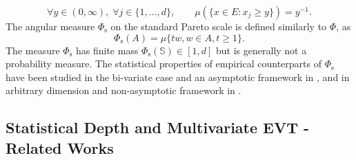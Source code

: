 \documentclass{article}
\numberwithin{equation}{section}
\newcommand{\norm}[1]{\left\Vert{#1}\right\Vert}
\newcommand{\point}{\,\cdot\,}
\newcommand{\sphere}{\mathbb{S}}
\newcommand{\Phitrad}{\Phi_{\mathrm{s}}} %
\begin{document}
\begin{equation*}
    \forall y \in (0, \infty),\;  \forall j \in \{1, \ldots, d\},
    \qquad \mu(\{x \in E : x_j \ge y \}) = y^{-1}.
\end{equation*}
The angular measure $\Phitrad$  on the standard Pareto scale is defined similarly to $\Phi$,  as %
\begin{equation}
    \label{eq:angularMeasure}
    \Phitrad(A) = \mu\{tw, w\in A, t \ge 1 \}. 
  \end{equation}
  The measure $\Phitrad$ has finite mass $\Phitrad(\sphere)\in[1,d]$ but is generally not a probability measure. The statistical properties of empirical counterparts of $\Phitrad$ have been studied in the bi-variate case and an asymptotic framework in \cite{einmahl2001nonparametric, einmahl2009maximum}, and in arbitrary dimension and non-asymptotic framework in \cite{ClemenconJalalzaiSabourinSegers2023}.

  

\subsection{Statistical Depth and Multivariate EVT - Related Works}\label{subsec:SoA}
%
\end{document}
